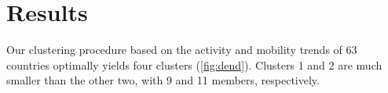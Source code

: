 \documentclass[preprint, 11pt]{elsarticle}
\newcommand{\?}{\stackrel{?}{=}}
\begin{document}









\section{Results }
Our clustering procedure based on the activity and mobility trends of 63 countries optimally yields four clusters (\autoref{fig:dend}).
Clusters 1 and 2 are much smaller than the other two, with 9 and 11 members, respectively.
\end{document}
